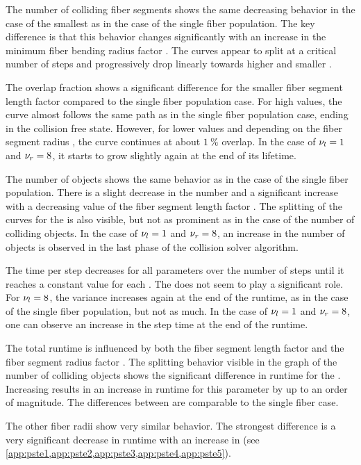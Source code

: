 \par
%
The number of colliding fiber segments shows the same decreasing behavior in the case of the smallest \segRadiusFactor{} as in the case of the single fiber population.
The key difference is that this behavior changes significantly with an increase in the minimum fiber bending radius factor \segRadiusFactor{}.
The curves appear to split at a critical number of steps and progressively drop linearly towards higher \segRadiusFactor{} and smaller \segLengthFactor{}.
\par
%
The overlap fraction shows a significant difference for the smaller fiber segment length factor \segLengthFactor{} compared to the single fiber population \pfbs{} case.
For high \segLengthFactor{} values, the curve almost follows the same path as in the single fiber population case, ending in the collision free state.
However, for lower values and depending on the fiber segment radius \segRadius{}, the curve continues at about $\SI{1}{\percent}$ overlap.
In the case of $\textnormal{$\nu_{l}$} = \SI{1}{}$ and $\textnormal{$\nu_{r}$} = \SI{8}{}$, it starts to grow slightly again at the end of its lifetime.
\par
%
The number of objects shows the same behavior as in the case of the single fiber population.
There is a slight decrease in the number and a significant increase with a decreasing value of the fiber segment length factor \segLengthFactor{}.
The splitting of the curves for the \segRadiusFactor{} is also visible, but not as prominent as in the case of the number of colliding objects.
In the case of $\textnormal{$\nu_{l}$} = \SI{1}{}$ and $\textnormal{$\nu_{r}$} = \SI{8}{}$, an increase in the number of objects is observed in the last phase of the collision solver algorithm.
\par
% 
The time per step decreases for all parameters over the number of steps until it reaches a constant value for each \segLengthFactor{}.
The \segRadiusFactor{} does not seem to play a significant role.
For $\textnormal{$\nu_{l}$}{} = \SI{8}{}$, the variance increases again at the end of the runtime, as in the case of the single fiber population, but not as much.
In the case of $\textnormal{$\nu_{l}$}{} = \SI{1}{}$ and $\textnormal{$\nu_{r}$} = \SI{8}{}$, one can observe an increase in the step time at the end of the runtime.
\par
%
The total runtime is influenced by both the fiber segment length factor \segLengthFactor{} and the fiber segment radius factor \segRadiusFactor{}.
The splitting behavior visible in the graph of the number of colliding objects shows the significant difference in runtime for the \segRadiusFactor{}.
Increasing \segRadiusFactor{} results in an increase in runtime for this parameter by up to an order of magnitude.
The differences between \segLengthFactor{} are comparable to the single fiber case.
\par
%
The other fiber radii show very similar behavior.
The strongest difference is a very significant decrease in runtime with an increase in \fiberRadiusMean{} (see \cref{app:pste1,app:pste2,app:pste3,app:pste4,app:pste5}).
%
%
%
